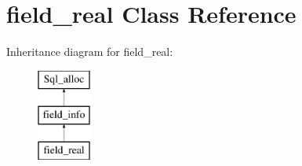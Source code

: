 \hypertarget{classfield__real}{}\section{field\+\_\+real Class Reference}
\label{classfield__real}
Inheritance diagram for field\+\_\+real\+:\begin{figure}[H]
\begin{center}
\leavevmode
\includegraphics[height=3.000000cm]{classfield__real}
\end{center}
\end{figure}
